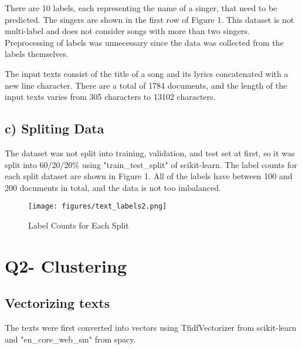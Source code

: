 \documentclass[a4paper,11pt]{article}
\begin{document}
There are 10 labels, each representing the name of a singer, that need to be predicted.
The singers are shown in the first row of Figure 1.
This dataset is not multi-label and does not consider songs with more than two singers.
Preprocessing of labels was unnecessary since the data was collected from the labels themselves.

The input texts consist of the title of a song and its lyrics concatenated with a new line character.
There are a total of 1784 documents, and the length of the input texts varies from 305 characters to 13102 characters.



\subsection{c) Spliting Data}
The dataset was not split into training, validation, and test set at first, 
so it was split into 60/20/20\% using "train\_test\_split" of scikit-learn.
The label counts for each split dataset are shown in Figure 1.
All of the labels have between 100 and 200 documents in total, and the data is not too imbalanced.

\begin{figure}[htbp]
  \begin{center}
  \texttt{[image: figures/text\_labels2.png]}
  \caption{Label Counts for Each Split}
  \end{center}
\end{figure}

\section{Q2- Clustering}
\subsection{Vectorizing texts}
The texts were first converted into vectors using TfidfVectorizer from scikit-learn and "en\_core\_web\_sm" from spacy.
\end{document}
